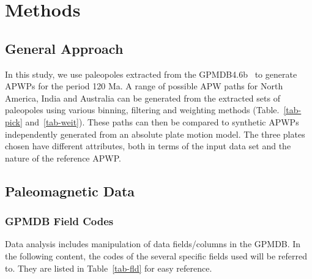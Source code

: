 \section{Methods}

\subsection{General Approach}

In this study, we use paleopoles extracted from the GPMDB4.6b~\citep{M96,P05} to
generate APWPs for the period 120 Ma. A range of possible APW paths
for North America, India and Australia can be generated from the extracted sets
of paleopoles using various binning, filtering and weighting methods
(Table.~\ref{tab-pick} and~\ref{tab-weit}). These paths can then be compared to
synthetic APWPs independently generated from an absolute plate motion model. The
three plates chosen have different attributes, both in terms of the input data
set and the nature of the reference APWP\@.

\subsection{Paleomagnetic Data}

\subsubsection{GPMDB Field Codes}

Data analysis includes manipulation of data fields/columns in the GPMDB\@. In
the following content, the codes of the several specific fields used will be
referred to. They are listed in Table~\ref{tab-fld} for easy reference.

